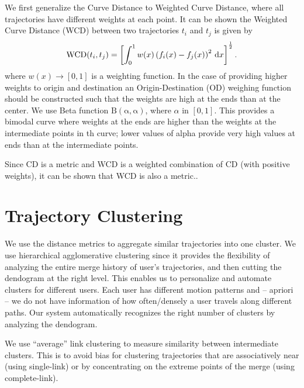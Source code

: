We first generalize the Curve Distance to Weighted Curve Distance, where all trajectories have different weights at each point.  It can be shown the Weighted Curve Distance (WCD) between two trajectories $t_i$ and $t_j$ is given by
\begin{align}
\operatorname{WCD}(t_i,t_j) = \left[ \int_{0}^{1}{ w(x) \left( f_i(x) - f_j(x) \right )^2\, \mathrm{d}x }\right] ^ {\frac{1}{2}}.
\end{align}
\noindent where $w(x) \rightarrow [0,1]$ is a weighting function. In the case of providing higher weights to origin and destination an Origin-Destination (OD) weighing function should be constructed such that the weights are high at the ends than at the center. We use Beta function $\operatorname{B(\alpha,\alpha)}$, where $\alpha$ in $[0,1]$. This provides a bimodal curve where weights at the ends are higher than the weights at the intermediate points in th curve; lower values of alpha provide very high values at ends than at the intermediate points.

Since CD is a metric and WCD is a weighted combination of CD (with positive weights), it can be shown that WCD is also a metric.. 

\section{Trajectory Clustering}
We use the distance metrics to aggregate similar trajectories into one cluster. We use hierarchical agglomerative clustering since it provides the flexibility of analyzing the entire merge history of user's trajectories, and then cutting the dendogram at the right level. This enables us to personalize and automate clusters for different users. Each user has different motion patterns and -- apriori -- we do not have information of how often/densely a user travels along different paths. Our system automatically recognizes the right number of clusters by analyzing the dendogram.

We use ``average'' link clustering to measure similarity between intermediate clusters. This is to avoid bias for clustering trajectories that are associatively near (using single-link) or by concentrating on the extreme points of the merge (using complete-link).

